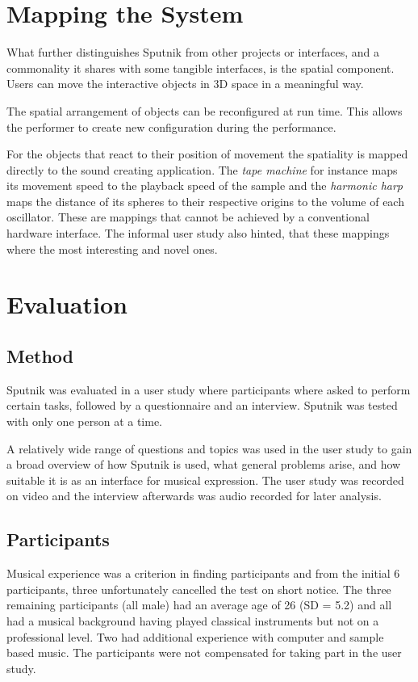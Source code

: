 \documentclass[10pt,a4paper]{scrartcl}
\begin{document}
\section{Mapping the System}
What further distinguishes Sputnik from other projects or interfaces, and a commonality it shares with some tangible interfaces, is the spatial component. Users can move the interactive objects in 3D space in a meaningful way.

The spatial arrangement of objects can be reconfigured at run time. This allows the performer to create new configuration during the performance. 

For the objects that react to their position of movement the spatiality is mapped directly to the sound creating application. The \emph{tape machine} for instance maps its movement speed to the playback speed of the sample and the \emph{harmonic harp} maps the distance of its spheres to their respective origins to the volume of each oscillator. These are mappings that cannot be achieved by a conventional hardware interface. The informal user study also hinted, that these mappings where the most interesting and novel ones.



\section{Evaluation}
\label{sec:evaluation}

\subsection{Method}
Sputnik was evaluated in a user study where participants where asked to perform certain tasks, followed by a questionnaire and an interview. Sputnik was tested with only one person at a time.

A relatively wide range of questions and topics was used in the user study to gain a broad overview of how Sputnik is used, what general problems arise, and how suitable it is as an interface for musical expression. The user study was recorded on video and the interview afterwards was audio recorded for later analysis.

\subsection{Participants}
Musical experience was a criterion in finding participants and from the initial 6 participants, three unfortunately cancelled the test on short notice. The three remaining participants (all male) had an average age of 26 (SD = 5.2) and all had a musical background having played classical instruments but not on a professional level. Two had additional experience with computer and sample based music. The participants were not compensated for taking part in the user study.
\end{document}
